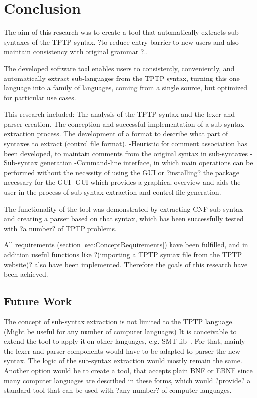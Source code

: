 
\chapter{Conclusion}\label{cha:Conclusion}

The aim of this research was to create a tool that automatically extracts sub-syntaxes of the \ac{TPTP} syntax. ?to reduce entry barrier to new users and also maintain consistency with original grammar  ?..

The developed software tool enables users to consistently, conveniently, and automatically extract sub-languages from the \ac{TPTP} syntax, turning this one language into a family of languages, coming from a single source, but optimized for particular use cases.

This research included:
The analysis of the \ac{TPTP} syntax and the lexer and parser creation.
The conception and successful implementation of a sub-syntax extraction process.
The development of a format to describe what part of syntaxes to extract (control file format).
-Heuristic for comment association has been developed, to maintain comments from the original syntax in sub-syntaxes
-Sub-syntax generation
-Command-line interface, in which main operations can be performed without the necessity of using the GUI or ?installing? the package necessary for the GUI
-GUI which provides a graphical overview and aids the user in the process of sub-syntax extraction and control file generation.

The functionality of the tool was demonstrated by extracting \ac{CNF} sub-syntax and creating a parser based on that syntax, which has been successfully tested with ?a number? of \ac{TPTP} problems.

All requirements (section \ref{sec:ConceptRequirements}) have been fulfilled, and in addition useful functions like ?(importing a \ac{TPTP} syntax file from the \ac{TPTP} website)? also have been implemented. Therefore the goals of this research have been achieved.
\section{Future Work}\label{sec:FutureWork}
The concept of sub-syntax extraction is not limited to the \ac{TPTP} language. (Might be useful for any number of computer languages)
It is conceivable to extend the tool to apply it on other languages, e.g. SMT-lib~\cite{BFT-SMTLIB-17}.
For that, mainly the lexer and parser components would have to be adapted to parser the new syntax. The logic of the sub-syntax extraction would mostly remain the same.\\
Another option would be to create a tool, that accepts plain \ac{BNF} or \ac{EBNF} since many computer languages are described in these forms, which would ?provide? a standard tool that can be used with ?any number? of computer languages.

